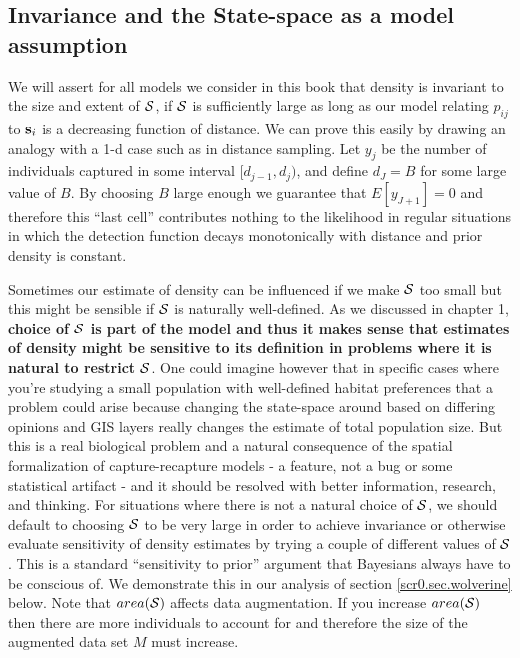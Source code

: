 \subsection{Invariance and the State-space as a model assumption}
\label{scr0.sec.invariance}

We will assert for all models we consider in this book that density is
invariant to the size and extent of ${\cal S}$, if ${\cal S}$ is
sufficiently large as long 
as our model relating $p_{ij}$ to ${\bf  s}_{i}$ is a decreasing
function of distance.  
We can prove this easily by drawing an analogy with a 1-d case such as
in distance sampling.  Let $y_{j}$ be the number of individuals
captured in some interval $[d_{j-1},d_{j})$, and define $d_{J} = B$
for some large value of $B$.  By choosing $B$ large enough we
guarantee that $E[y_{J+1}] = 0$ and therefore this ``last cell'' 
contributes nothing to
the likelihood
in regular situations in which the detection function decays
monotonically with distance and prior density is constant.  


Sometimes
our estimate of density can be influenced if we make ${\cal S}$ too small but
this might be sensible if ${\cal S}$ is naturally well-defined. As we discussed
in chapter 1, {\bf choice of ${\cal S}$ is part of the model and thus it makes
  sense that estimates of density might be sensitive to its definition
  in problems where it is natural to restrict ${\cal S}$}.
One could imagine
however that in specific cases where you're studying a small
population with well-defined habitat preferences that a problem could
arise because changing the state-space around based on differing
opinions and GIS layers really changes the estimate of total
population size. But this is a real biological problem and a natural
consequence of the spatial formalization of capture-recapture models -
a feature, not a bug or some statistical artifact - and it should be
resolved with better information, research, and thinking.
 For situations where there is not a natural
choice of ${\cal S}$, we should default to choosing ${\cal S}$ to be very large in order
to achieve invariance or otherwise evaluate sensitivity of density
estimates by trying a couple of different values of ${\cal S}$. This is a
standard ``sensitivity to prior'' argument that Bayesians always have
to be conscious of.  We demonstrate this in our analysis of section
\ref{scr0.sec.wolverine}
below. Note that $area({\cal S})$ affects data augmentation. If you
increase $area({\cal S})$ then there are more individuals to account for and
therefore the size of the augmented data set $M$ must increase.

